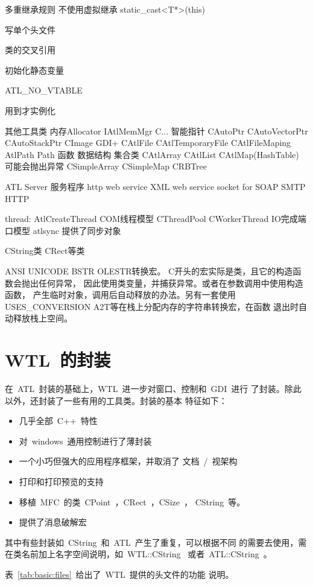 多重继承规则 不使用虚拟继承
static\_cast<T*>(this)

 写单个头文件

类的交叉引用

初始化静态变量

ATL\_NO\_VTABLE

用到才实例化

其他工具类
内存Allocator IAtlMemMgr C...
智能指针 CAutoPtr CAutoVectorPtr CAutoStackPtr
CImage GDI+
CAtlFile CAtlTemporaryFile CAtlFileMaping
AtlPath Path 函数
数据结构 集合类 CAtlArray CAtlList CAtlMap(HashTable) 可能会抛出异常
CSimpleArray CSimpleMap
CRBTree


ATL Server 服务程序 http web service XML web service
socket for SOAP SMTP HTTP

thread: AtlCreateThread COM线程模型
CThreadPool CWorkerThread IO完成端口模型
atlsync 提供了同步对象

CString类
CRect等类

ANSI UNICODE BSTR OLESTR转换宏。
C开头的宏实际是类，且它的构造函数会抛出任何异常，
因此使用类变量，并捕获异常。或者在参数调用中使用构造函数，
产生临时对象，调用后自动释放的办法。另有一套使用
USES\_CONVERSION A2T等在栈上分配内存的字符串转换宏，在函数
退出时自动释放栈上空间。

\section{WTL~的封装}

在~ATL~封装的基础上，WTL~进一步对窗口、控制和~GDI~进行
了封装。除此以外，还封装了一些有用的工具类。封装的基本
特征如下：
\begin{itemize}
    \item 几乎全部~C++~特性
    \item 对~windows~通用控制进行了薄封装
    \item 一个小巧但强大的应用程序框架，并取消了
文档~/~视架构
    \item 打印和打印预览的支持
    \item 移植~MFC~的类~CPoint~，CRect~，CSize~，
CString~等。
    \item 提供了消息破解宏
\end{itemize}

其中有些封装如~CString~和~ATL~产生了重复，可以根据不同
的需要去使用，需在类名前加上名字空间说明，如~WTL::CString~
或者~ATL::CString~。

表~\ref{tab:basic:files}~给出了~WTL~提供的头文件的功能
说明。

